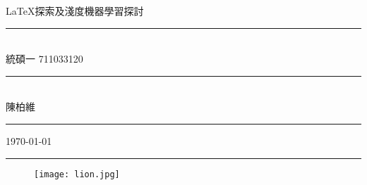   									
\usepackage{wallpaper} %
\makeindex 						

\fontsize{38}{30pt}\selectfont
\thispagestyle{empty}
\begin{flushright}
    {\MB \LaTeX 探索及淺度機器學習探討}\\
    \rule{3in}{0.2pt}\\
    \medskip\hfill \Large {\MB 統碩一 711033120}\rule{8mm}{0pt}\\
    \medskip\hfill \Large {\MB 陳柏維}\rule{8mm}{0pt}
    \medskip \par\vspace*{-2pt}\hfill \small\today\rule{8mm}{0pt}
\end{flushright}
\bigskip\bigskip\bigskip\bigskip
\begin{figure}[h]
    \centering
        \texttt{[image: lion.jpg]}%
    \end{figure}
    
\begin{figure}[H]
    \centering
        \hspace{1.4cm}
\end{figure}
    
\fontsize{12}{22pt}\selectfont

\newpage
\cleardoublepage
\setcounter{tocdepth}{2} %

\tableofcontents
\newpage
\renewcommand{\numberline}[1]{\loflabel~#1\hspace*{1em}}%
\listoffigures %
\newpage
\renewcommand{\numberline}[1]{\lotlabel~#1\hspace*{1em}}%
\listoftables %
\newpage
\ifodd{} \else \thispagestyle{empty}\mbox{}\clearpage\fi %
\setcounter{page}{1} 		%







%
%
%
%
%
%   

